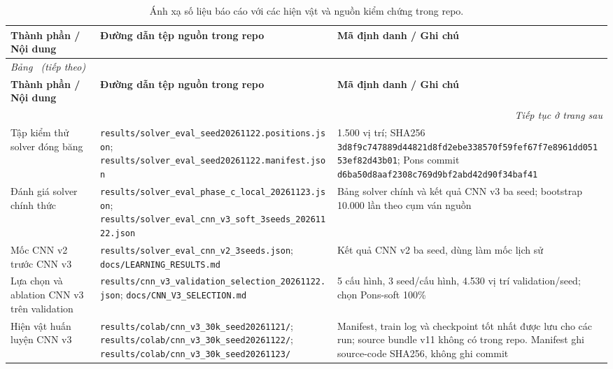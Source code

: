 \documentclass[11pt, a4paper]{article}
\begin{document}
\small
\begin{longtable}{@{}p{3.4cm}p{7.1cm}p{4.0cm}@{}}
    \caption{Ánh xạ số liệu báo cáo với các hiện vật và nguồn kiểm chứng trong repo.}
    \label{tab:artifact_traceability}\\
    \toprule
    \textbf{Thành phần / Nội dung} & \textbf{Đường dẫn tệp nguồn trong repo} & \textbf{Mã định danh / Ghi chú} \\
    \midrule
    \endfirsthead

    \multicolumn{3}{l}{\textit{Bảng~\thetable{} (tiếp theo)}}\\
    \toprule
    \textbf{Thành phần / Nội dung} & \textbf{Đường dẫn tệp nguồn trong repo} & \textbf{Mã định danh / Ghi chú} \\
    \midrule
    \endhead

    \midrule
    \multicolumn{3}{r}{\textit{Tiếp tục ở trang sau}}\\
    \endfoot

    \bottomrule
    \endlastfoot

    Tập kiểm thử solver đóng băng
    & \texttt{results/solver\_eval\_seed20261122.positions.json};
      \texttt{results/solver\_eval\_seed20261122.manifest.json}
    & 1.500 vị trí; SHA256
      \texttt{3d8f9c747889d44821d8fd2ebe338570f59fef67f7e8961dd05153ef82d43b01};
      Pons commit
      \texttt{d6ba50d8aaf2308c769d9bf2abd42d90f34baf41} \\

    Đánh giá solver chính thức
    & \texttt{results/solver\_eval\_phase\_c\_local\_20261123.json};
      \texttt{results/solver\_eval\_cnn\_v3\_soft\_3seeds\_20261122.json}
    & Bảng solver chính và kết quả CNN v3 ba seed; bootstrap 10.000 lần theo cụm ván nguồn \\

    Mốc CNN v2 trước CNN v3
    & \texttt{results/solver\_eval\_cnn\_v2\_3seeds.json};
      \texttt{docs/LEARNING\_RESULTS.md}
    & Kết quả CNN v2 ba seed, dùng làm mốc lịch sử \\

    Lựa chọn và ablation CNN v3 trên validation
    & \texttt{results/cnn\_v3\_validation\_selection\_20261122.json};
      \texttt{docs/CNN\_V3\_SELECTION.md}
    & 5 cấu hình, 3 seed/cấu hình, 4.530 vị trí validation/seed; chọn Pons-soft 100\% \\

    Hiện vật huấn luyện CNN v3
    & \texttt{results/colab/cnn\_v3\_30k\_seed20261121/};
      \texttt{results/colab/cnn\_v3\_30k\_seed20261122/};
      \texttt{results/colab/cnn\_v3\_30k\_seed20261123/}
    & Manifest, train log và checkpoint tốt nhất được lưu cho các run; source bundle v11 không có trong repo. Manifest ghi source-code SHA256, không ghi commit \\


\end{longtable}
\end{document}
